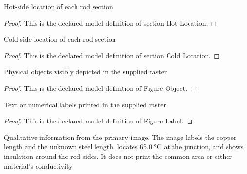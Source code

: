 \begin{definition}
  \label{def:physics:phyx-mini-0331:phyxminiproblems-problemphyxmini0331-sectionhotlocation}
  Hot-side location of each rod section
\end{definition}
\begin{proof}
  This is the declared model definition of section Hot Location.
\end{proof}
\begin{definition}
  \label{def:physics:phyx-mini-0331:phyxminiproblems-problemphyxmini0331-sectioncoldlocation}
  Cold-side location of each rod section
\end{definition}
\begin{proof}
  This is the declared model definition of section Cold Location.
\end{proof}
\begin{definition}
  \label{def:physics:phyx-mini-0331:phyxminiproblems-problemphyxmini0331-figureobject}
  Physical objects visibly depicted in the supplied raster
\end{definition}
\begin{proof}
  This is the declared model definition of Figure Object.
\end{proof}
\begin{definition}
  \label{def:physics:phyx-mini-0331:phyxminiproblems-problemphyxmini0331-figurelabel}
  Text or numerical labels printed in the supplied raster
\end{definition}
\begin{proof}
  This is the declared model definition of Figure Label.
\end{proof}
\begin{definition}
  \label{def:physics:phyx-mini-0331:phyxminiproblems-problemphyxmini0331-compositerodfigure}
  Qualitative information from the primary image. The image labels the copper length and the unknown steel length, locates 65.0 °C at the junction, and shows insulation around the rod sides. It does not print the common area or either material's conductivity
\end{definition}
